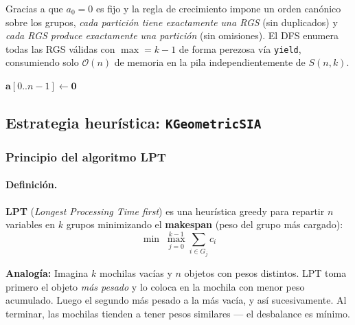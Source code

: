 \documentclass[12pt,letterpaper]{article}
\theoremstyle{definition}
\theoremstyle{remark}
\newcommand{\Stir}[2]{S(#1,#2)}
\newcommand{\BigO}[1]{\mathcal{O}(#1)}
\begin{document}
Gracias a que $a_0 = 0$ es fijo y la regla de crecimiento impone un orden canónico
sobre los grupos, \emph{cada partición tiene exactamente una RGS} (sin duplicados) y
\emph{cada RGS produce exactamente una partición} (sin omisiones). El DFS enumera todas
las RGS válidas con $\max = k-1$ de forma perezosa vía \texttt{yield}, consumiendo
solo $\BigO{n}$ de memoria en la pila independientemente de $\Stir{n}{k}$.

\begin{algorithm}[H]
\SetAlgoLined
{}
$\mathbf{a}[0..n-1] \leftarrow \mathbf{0}$\;
\;
\caption{\texttt{particionar\_conjunto(elementos, k)} --- DFS sobre RGS, $\BigO{n}$ espacio}
\label{alg:rgs}
\end{algorithm}

\subsection{Estrategia heurística: \texttt{KGeometricSIA}}
\label{sec:kgeomip}

\subsubsection{Principio del algoritmo LPT}

\paragraph{Definición.}
\textbf{LPT} (\emph{Longest Processing Time first}) es una heurística greedy para
repartir $n$ variables en $k$ grupos minimizando el \textbf{makespan}
(peso del grupo más cargado):
\begin{equation}
  \min\; \max_{j=0}^{k-1} \sum_{i \in G_j} c_i
  \label{eq:lpt-objetivo}
\end{equation}

\begin{blueBox}
\textbf{Analogía:} Imagina $k$ mochilas vacías y $n$ objetos con pesos distintos.
LPT toma primero el objeto \emph{más pesado} y lo coloca en la mochila con menor
peso acumulado. Luego el segundo más pesado a la más vacía, y así sucesivamente.
Al terminar, las mochilas tienden a tener pesos similares --- el desbalance es mínimo.
\end{blueBox}
\end{document}
